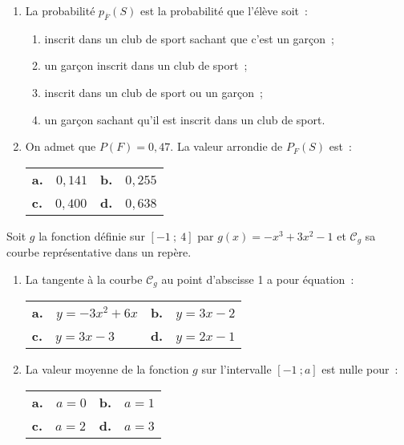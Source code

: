                \begin{enumerate}
          \item La probabilité $p_{\overline{F}}(S)$ est la probabilité que l'élève soit~:
          \begin{enumerate}[label=\alph*.]
               \item inscrit dans un club de sport sachant que c'est un garçon~;
               \item un garçon inscrit dans un club de sport~;
               \item inscrit dans un club de sport ou un garçon~;
               \item un garçon sachant qu'il est inscrit dans un club de sport.
          \end{enumerate}

     \item On admet que $P(F)=0,47$. La valeur arrondie de $P_{F}(S)$ est~:
     \begin{tabularx}{\linewidth}{XX}%
          \textbf{a.}~~$0,141$ & \textbf{b.}~~$0,255$ \\
           \textbf{c.}~~$0,400$ & \textbf{d.}~~$0,638$
     \end{tabularx}
     \medbreak
     \end{enumerate}
Soit $g$ la fonction définie sur $[-1~;~4]$ par $g(x) = - x^3 + 3x^2 - 1$ et $\mathscr{C}_g$ sa courbe représentative dans un repère.
\begin{enumerate}
     \item La tangente à la courbe $\mathscr{C}_g$ au point d'abscisse 1 a pour équation~:
     \begin{center}
          \begin{tabularx}{\linewidth}{XX}%
               \textbf{a.}~~$y = - 3x^2 + 6x$ & \textbf{b.}~~$y= 3x-2$ \\
                \textbf{c.}~~$y= 3x - 3$ & \textbf{d.}~~$y = 2x - 1$
          \end{tabularx}
     \end{center}
     \item La valeur moyenne de la fonction $g$ sur l'intervalle $[-1~; a]$ est nulle pour~:
     \begin{center}
           \begin{tabularx}{\linewidth}{XX}%
              \textbf{a.}~~$a=0$ & \textbf{b.}~~$a=1$\\
               \textbf{c.}~~$a=2$ & \textbf{d.}~~$a=3$
          \end{tabularx}
     \end{center}
     \end{enumerate}

